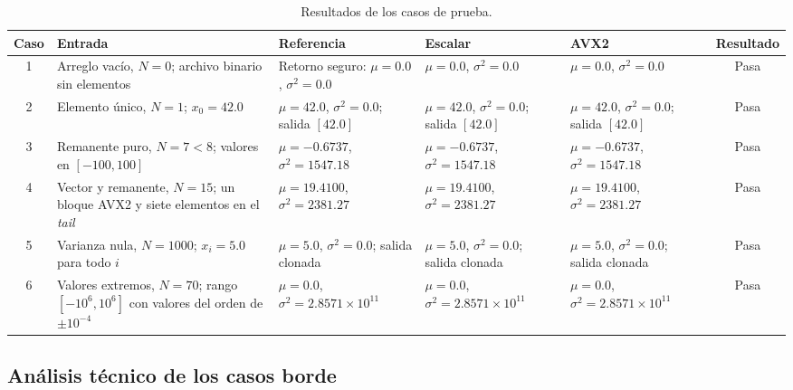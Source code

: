 \documentclass[journal]{IEEEtran}
\begin{document}
\begin{table}[!t]
  \centering
  \caption{Resultados de los casos de prueba.}
  \label{tab:pruebas}
  \scriptsize
  \setlength{\tabcolsep}{3pt}
  \begin{tabularx}{\textwidth}{@{}c>{\raggedright\arraybackslash}p{}
    >{\raggedright\arraybackslash}X
    >{\raggedright\arraybackslash}X
    >{\raggedright\arraybackslash}Xc@{}}
    \toprule
    Caso & Entrada & Referencia & Escalar & AVX2 & Resultado \\
    \midrule
    1 & Arreglo vacío, $N=0$; archivo binario sin elementos &
      Retorno seguro: $\mu=0.0$, $\sigma^2=0.0$ &
      $\mu=0.0$, $\sigma^2=0.0$ &
      $\mu=0.0$, $\sigma^2=0.0$ & Pasa \\

    2 & Elemento único, $N=1$; $x_0=42.0$ &
      $\mu=42.0$, $\sigma^2=0.0$; salida $[42.0]$ &
      $\mu=42.0$, $\sigma^2=0.0$; salida $[42.0]$ &
      $\mu=42.0$, $\sigma^2=0.0$; salida $[42.0]$ & Pasa \\

    3 & Remanente puro, $N=7<8$; valores en $[-100,100]$ &
      $\mu=-0.6737$, $\sigma^2=1547.18$ &
      $\mu=-0.6737$, $\sigma^2=1547.18$ &
      $\mu=-0.6737$, $\sigma^2=1547.18$ & Pasa \\

    4 & Vector y remanente, $N=15$; un bloque AVX2 y siete elementos en el
      \textit{tail} &
      $\mu=19.4100$, $\sigma^2=2381.27$ &
      $\mu=19.4100$, $\sigma^2=2381.27$ &
      $\mu=19.4100$, $\sigma^2=2381.27$ & Pasa \\

    5 & Varianza nula, $N=1000$; $x_i=5.0$ para todo $i$ &
      $\mu=5.0$, $\sigma^2=0.0$; salida clonada &
      $\mu=5.0$, $\sigma^2=0.0$; salida clonada &
      $\mu=5.0$, $\sigma^2=0.0$; salida clonada & Pasa \\

    6 & Valores extremos, $N=70$; rango $[-10^6,10^6]$ con valores del orden
      de $\pm10^{-4}$ &
      $\mu=0.0$, $\sigma^2=2.8571\times10^{11}$ &
      $\mu=0.0$, $\sigma^2=2.8571\times10^{11}$ &
      $\mu=0.0$, $\sigma^2=2.8571\times10^{11}$ & Pasa \\
    \bottomrule
  \end{tabularx}
\end{table}

\subsection{Análisis técnico de los casos borde}
\end{document}
